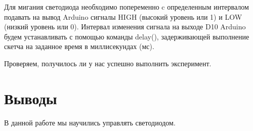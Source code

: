 \documentclass[
  english,
  russian,
  12pt,
  a4paper,
  DIV=11,
  numbers=noendperiod]{scrreprt}
\begin{document}
Для мигания светодиода необходимо попеременно c определенным интервалом
подавать на вывод Arduino сигналы HIGH (высокий уровень или 1) и LOW
(низкий уровень или 0). Интервал изменения сигнала на выходе D10 Arduino
будем устанавливать с помощью команды delay(), задерживающей выполнение
скетча на заданное время в миллисекундах (мс).

Проверяем, получилось ли у нас успешно выполнить эксперимент.

\chapter{Выводы}\label{ux432ux44bux432ux43eux434ux44b}

В данной работе мы научились управлять светодиодом.


\printbibliography
\end{document}
